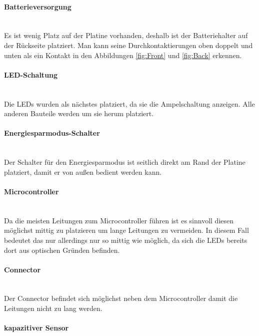 \documentclass[a4paper,
DIV=13,
12pt,
BCOR=10mm,
department=FakEI,
parskip=half,
automark,
]{article}
\begin{document}
\paragraph{Batterieversorgung} $~$ \\

Es ist wenig Platz auf der Platine vorhanden, deshalb ist der Batteriehalter auf der Rückseite platziert. Man kann seine Durchkontaktierungen oben doppelt und unten als ein Kontakt in den Abbildungen \ref{fig:Front} und \ref{fig:Back} erkennen. 

\paragraph{LED-Schaltung} $~$ \\

Die LEDs wurden als nächstes platziert, da sie die Ampelschaltung anzeigen. Alle anderen Bauteile werden um sie herum platziert.

\paragraph{Energiesparmodus-Schalter} $~$ \\

Der Schalter für den Energiesparmodus ist seitlich direkt am Rand der Platine platziert, damit er von außen bedient werden kann. 

\paragraph{Microcontroller} $~$ \\

Da die meisten Leitungen zum Microcontroller führen ist es sinnvoll diesen möglichst mittig zu platzieren um lange Leitungen zu vermeiden. In diesem Fall bedeutet das nur allerdings nur so mittig wie möglich, da sich die LEDs bereits dort aus optischen Gründen befinden. 

\paragraph{Connector} $~$ \\

Der Connector befindet sich möglichst neben dem Microcontroller damit die Leitungen nicht zu lang werden.

\paragraph{kapazitiver Sensor} $~$ \\
\end{document}
